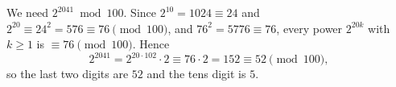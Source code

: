 We need $2^{2041}\bmod100$. Since $2^{10}=1024\equiv24$ and $2^{20}\equiv24^2=576\equiv76\pmod{100}$, and $76^2=5776\equiv76$, every power $2^{20k}$ with $k\ge1$ is $\equiv76\pmod{100}$. Hence
\[
2^{2041}=2^{20\cdot102}\cdot2\equiv76\cdot2=152\equiv52\pmod{100},
\]
so the last two digits are $52$ and the tens digit is $\boxed{5}$.
